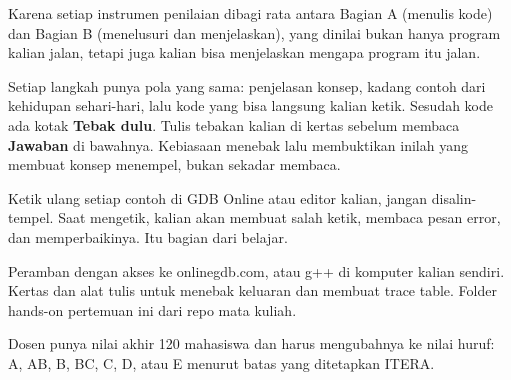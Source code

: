 \documentclass[a4paper]{article}
\begin{document}
\par\vspace{4pt}\par\vspace{6pt}
Karena setiap instrumen penilaian dibagi rata antara Bagian A (menulis kode) dan Bagian B (menelusuri dan menjelaskan), yang dinilai bukan hanya program kalian jalan, tetapi juga kalian bisa menjelaskan mengapa program itu jalan.

Setiap langkah punya pola yang sama: penjelasan konsep, kadang contoh dari kehidupan sehari-hari, lalu kode yang bisa langsung kalian ketik. Sesudah kode ada kotak \textbf{Tebak dulu}. Tulis tebakan kalian di kertas sebelum membaca \textbf{Jawaban} di bawahnya. Kebiasaan menebak lalu membuktikan inilah yang membuat konsep menempel, bukan sekadar membaca.

\begin{Penting}
Ketik ulang setiap contoh di GDB Online atau editor kalian, jangan disalin-tempel. Saat mengetik, kalian akan membuat salah ketik, membaca pesan error, dan memperbaikinya. Itu bagian dari belajar.
\end{Penting}
Peramban dengan akses ke onlinegdb.com, atau g++ di komputer kalian sendiri. Kertas dan alat tulis untuk menebak keluaran dan membuat trace table. Folder hands-on pertemuan ini dari repo mata kuliah.

Dosen punya nilai akhir 120 mahasiswa dan harus mengubahnya ke nilai huruf: A, AB, B, BC, C, D, atau E menurut batas yang ditetapkan ITERA.
\end{document}
